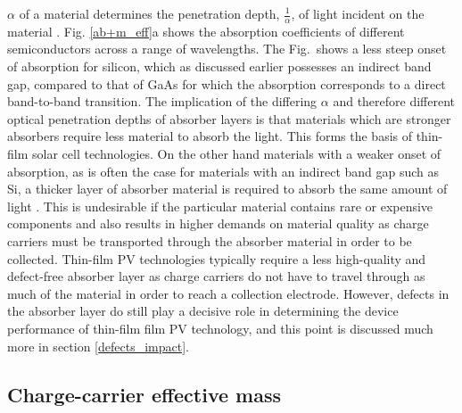 \documentclass[11pt, twoside]{report}
\begin{document}
$\alpha$ of a material determines the penetration depth, $\frac{1}{\alpha}$, of light incident on the material \cite{absorption_coeff_book1}. Fig. \ref{ab+m_eff}a shows the absorption coefficients of different semiconductors across a range of wavelengths. The Fig.~shows a less steep onset of absorption for silicon, which as discussed earlier possesses an indirect band gap, compared to that of GaAs for which the absorption corresponds to a direct band-to-band transition. 
The implication of the differing $\alpha$ and therefore different optical penetration depths of absorber layers is that materials which are stronger absorbers require less material to absorb the light. This forms the basis of thin-film solar cell technologies.
On the other hand materials with a weaker onset of absorption, as is often the case for materials with an indirect band gap such as Si, a thicker layer of absorber material is required to absorb the same amount of light \cite{PV_bands_book}. This is undesirable if the particular material contains rare or expensive components and also results in higher demands on material quality as charge carriers must be transported through the absorber material in order to be collected.
Thin-film PV technologies typically require a less high-quality and defect-free absorber layer as charge carriers do not have to travel through as much of the material in order to reach a collection electrode. However, defects in the absorber layer do still play a decisive role in determining the device performance of thin-film film PV technology, and this point is discussed much more in section \ref{defects_impact}.

\subsection{Charge-carrier effective mass}
\end{document}
